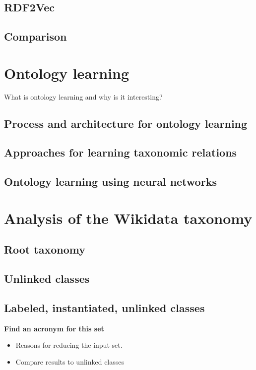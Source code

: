 \documentclass{scrartcl} %
\begin{document}
\subsection{RDF2Vec}

\subsection{Comparison}

\section{Ontology learning}
What is ontology learning and why is it interesting?

\subsection{Process and architecture for ontology learning}

\subsection{Approaches for learning taxonomic relations}

\subsection{Ontology learning using neural networks}

\section{Analysis of the Wikidata taxonomy}

\subsection{Root taxonomy}

\subsection{Unlinked classes}

\subsection{Labeled, instantiated, unlinked classes}
\textbf{Find an acronym for this set}
\begin{itemize}
\item Reasons for reducing the input set.
\item Compare results to unlinked classes
\end{itemize}
\end{document}
